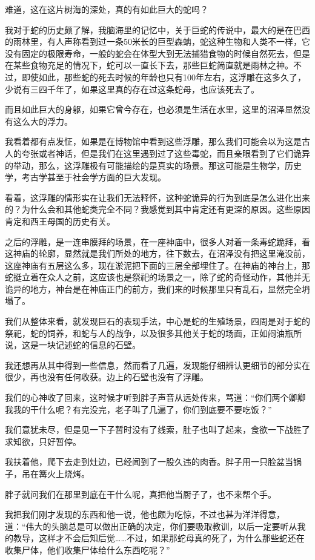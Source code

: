 难道，这在这片树海的深处，真的有如此巨大的蛇吗？

我对于蛇的历史颇了解，我脑海里的记忆中，关于巨蛇的传说中，最大的是在巴西的雨林里，有人声称看到过一条50米长的巨型森蚺，蛇这种生物和人类不一样，它没有固定的极限寿命，一般的蛇会在体型大到无法捕猎食物的时候自然死去，但是在某些食物充足的情况下，蛇可以一直长下去，那些巨蛇简直就是雨林之神。不过，即使如此，那些蛇的死去时候的年龄也只有100年左右，这浮雕在这多久了，少说有三四千年了，如果这里真的存在过这条蛇母，也应该死去了。

而且如此巨大的身躯，如果它曾今存在，也必须是生活在水里，这里的沼泽显然没有这么大的浮力。

我看着都有点发怔，如果是在博物馆中看到这些浮雕，那么我们可能会以为这是古人的夸张或者神话，但是我们在这里遇到过了这些毒蛇，而且亲眼看到了它们诡异的举动，那么，这浮雕极有可能描绘的是真实的场景。那这可能是生物学，历史学，考古学甚至于社会学方面的巨大发现。

看着，这浮雕的情形实在让我们无法释怀，这种蛇诡异的行为到底是怎么进化出来的？为什么会和其他蛇类完全不同？我感觉到其中肯定还有更深的原因。这些原因肯定和西王母国的历史有关。

之后的浮雕，是一连串膜拜的场景，在一座神庙中，很多人对着一条毒蛇跪拜，看这神庙的轮廓，显然就是我们所处的地方，往下数去，在沼泽没有把这里淹没前，这座神庙有五层这么多，现在淤泥把下面的三层全部埋住了。在神庙的神台上，那蛇挺立着在众人之前，这应该也是祭祀的场景之一，除了蛇的奇怪动作，其他并无诡异的地方，神台是在神庙正门的前方，我们来的时候那里只有乱石，显然完全坍塌了。

我们从整体来看，就发现巨石的表现手法，中心是蛇的生殖场景，四周是对于蛇的祭祀，蛇的饲养，和蛇与人的战争，以及很多其他关于蛇的场面，正如闷油瓶所说，这是一块记述蛇的信息的石壁。

我还想再从其中得到一些信息，然而看了几遍，发现能仔细辨认更细节的部分实在很少，再也没有任何收获。边上的石壁也没有了浮雕。

我们的心神收了回来，这时候才听到胖子声音从远处传来，骂道：“你们两个卿卿我我的干什么呢？有完没完，老子叫了几遍了，你们到底要不要吃饭？”

我们意犹未尽，但是见一下子暂时没有了线索，肚子也叫了起来，食欲一下战胜了求知欲，只好暂停。

我扶着他，爬下去走到灶边，已经闻到了一股久违的肉香。胖子用一只脸盆当锅子，吊在篝火上烧烤。

胖子就问我们在那里到底在干什么呢，真把他当厨子了，也不来帮个手。

我把我们刚才发现的东西和他一说，他也颇为吃惊，不过也甚为洋洋得意，道：“伟大的头脑总是可以做出正确的决定，你们要吸取教训，以后一定要听从我的教导，这样才不会后知后觉……不过，如果那蛇母真的死了，为什么那些蛇还在收集尸体，他们收集尸体给什么东西吃呢？”

